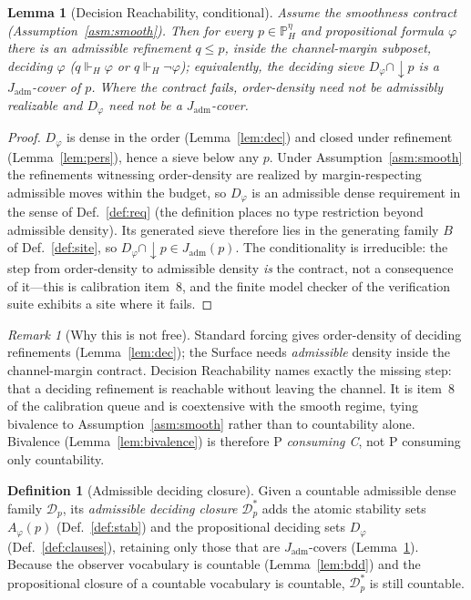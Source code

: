 \documentclass[11pt]{article}
\newtheorem{lemma}{Lemma}
\theoremstyle{definition}
\newtheorem{definition}{Definition}
\theoremstyle{remark}
\newtheorem*{remark}{Remark}
\newcommand{\forcesH}{\Vdash_{H}}
\newcommand{\PHeta}{\mathbb{P}_{H}^{\eta}}
\newcommand{\refines}{\leq}
\newcommand{\Jadm}{J_{\mathrm{adm}}}
\begin{document}
\begin{lemma}[Decision Reachability, conditional]\label{lem:reach}
Assume the smoothness contract (Assumption~\ref{asm:smooth}). Then for every $p\in\PHeta$ and
propositional formula $\varphi$ there is an admissible refinement $q\refines p$, inside the
channel-margin subposet, deciding $\varphi$ ($q\forcesH\varphi$ or $q\forcesH\neg\varphi$);
equivalently, the deciding sieve $D_\varphi\cap{\downarrow}p$ is a $\Jadm$-cover of $p$. Where the
contract fails, order-density need not be admissibly realizable and $D_\varphi$ need not be a
$\Jadm$-cover.
\end{lemma}

\begin{proof}
$D_\varphi$ is dense in the order (Lemma~\ref{lem:dec}) and closed under refinement
(Lemma~\ref{lem:pers}), hence a sieve below any $p$. Under Assumption~\ref{asm:smooth} the
refinements witnessing order-density are realized by margin-respecting admissible moves within the
budget, so $D_\varphi$ is an admissible dense requirement in the sense of Def.~\ref{def:req} (the
definition places no type restriction beyond admissible density). Its generated sieve therefore lies
in the generating family $B$ of Def.~\ref{def:site}, so $D_\varphi\cap{\downarrow}p\in\Jadm(p)$.
The conditionality is irreducible: the step from order-density to admissible density \emph{is} the
contract, not a consequence of it---this is calibration item~8, and the finite model checker of the
verification suite exhibits a site where it fails.
\end{proof}

\begin{remark}[Why this is not free]
Standard forcing gives order-density of deciding refinements (Lemma~\ref{lem:dec}); the Surface needs
\emph{admissible} density inside the channel-margin contract. Decision Reachability names exactly the
missing step: that a deciding refinement is reachable without leaving the channel. It is item~8 of the
calibration queue and is coextensive with the smooth regime, tying bivalence to
Assumption~\ref{asm:smooth} rather than to countability alone. Bivalence
(Lemma~\ref{lem:bivalence}) is therefore P \emph{consuming C}, not P consuming only countability.
\end{remark}

\begin{definition}[Admissible deciding closure]\label{def:closure}
Given a countable admissible dense family $\mathcal{D}_p$, its \emph{admissible deciding closure}
$\mathcal{D}_p^\ast$ adds the atomic stability sets $A_\varphi(p)$ (Def.~\ref{def:stab}) and the
propositional deciding sets $D_\varphi$ (Def.~\ref{def:clauses}), retaining only those that are
$\Jadm$-covers (Lemma~\ref{lem:reach}). Because the observer vocabulary is countable (Lemma~\ref{lem:bdd})
and the propositional closure of a countable vocabulary is countable, $\mathcal{D}_p^\ast$ is still
countable.
\end{definition}
\end{document}
